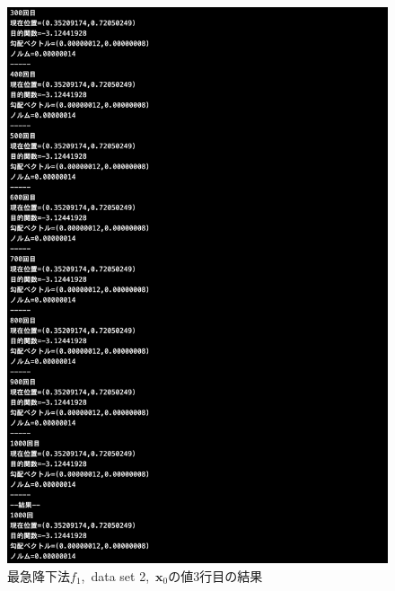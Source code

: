 \documentclass[12pt]{jarticle}
\begin{document}
\begin{figure}[h]
\begin{minipage}{0.5\hsize}
\begin{center}
            \includegraphics[scale=0.2]{kadai1_1s_out2_3_3.png}
        \end{center}
    \end{minipage}
    \caption{最急降下法$f_1$,\ data set 2,\ $\boldsymbol{x}_0$の値3行目の結果}
\end{figure}
\end{document}
